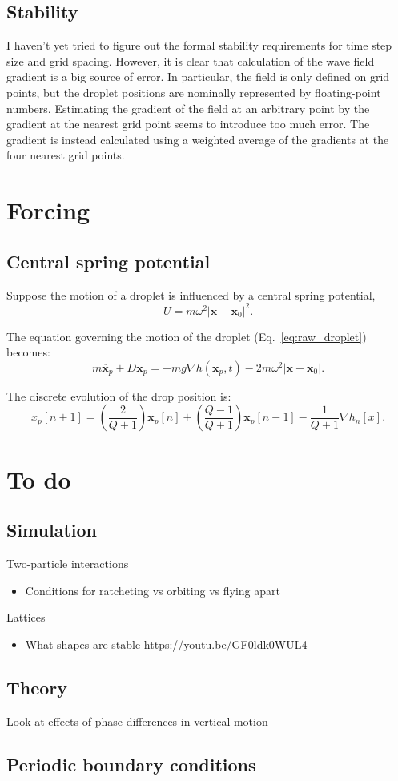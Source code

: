 \documentclass{article}
\newcommand{\x}{\mathbf{x}}
\begin{document}
\subsection{Stability}
I haven't yet tried to figure out the formal stability requirements for time step size and grid spacing.
However, it is clear that calculation of the wave field gradient is a big source of error. In particular, the field is only defined on grid points, but the droplet positions are nominally represented by floating-point numbers. Estimating the gradient of the field at an arbitrary point by the gradient at the nearest grid point seems to introduce too much error. The gradient is instead calculated using a weighted average of the gradients at the four nearest grid points.\\
 

\section{Forcing}

\subsection{Central spring potential}
Suppose the motion of a droplet is influenced by a central spring potential, 
\begin{equation}
    \label{eq:spring_potential}
    U = m \omega^2 \left| \x - \x_0 \right|^2.
\end{equation}

The equation governing the motion of the droplet (Eq.~\ref{eq:raw_droplet}) becomes:
\begin{equation}
    \label{eq:raw_droplet_spring}
	m \ddot{\x_p} + D \dot{\x_p} = - m g \nabla h(\x_p,t) - 2 m \omega^2 \left| \x - \x_0 \right|.
\end{equation}

The discrete evolution of the drop position is:
\begin{equation}
	x_p[n+1] = \left( \frac{2}{Q+1} \right) \x_p[n] + \left( \frac{Q-1}{Q+1} \right) \x_p[n-1] - \frac{1}{Q+1} \nabla h_{n}[x]\label{eq:drop_evolution_spring}.
\end{equation}


\section{To do}
\subsection{Simulation}
Two-particle interactions
\begin{itemize}
	\item Conditions for ratcheting vs orbiting vs flying apart
\end{itemize}
Lattices
\begin{itemize}
	\item What shapes are stable \url{https://youtu.be/GF0ldk0WUL4}
\end{itemize}
\subsection{Theory}
Look at effects of phase differences in vertical motion
\subsection{Periodic boundary conditions}
	
\end{document}
